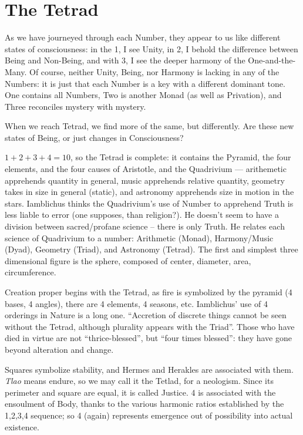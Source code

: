 \section{The Tetrad}

As we have journeyed through each Number, they appear to us like different states of consciousness: in the 1, I see Unity, in 2, I behold the difference between Being and Non-Being, and with 3, I see the deeper harmony of the One-and-the-Many. Of course, neither Unity, Being, nor Harmony is lacking in any of the Numbers: it is just that each Number is a key with a different dominant tone. One contains all Numbers, Two is another Monad (as well as Privation), and Three reconciles mystery with mystery.

When we reach Tetrad, we find more of the same, but differently. Are these new states of Being, or just changes in Consciousness?

$1+2+3+4=10$, so the Tetrad is complete: it contains the Pyramid, the four elements, and the four causes of Aristotle, and the Quadrivium --- arithemetic apprehends quantity in general, music apprehends relative quantity, geometry takes in size in general (static), and astronomy apprehends size in motion in the stars. Iamblichus thinks the Quadrivium's use of Number to apprehend Truth is less liable to error (one supposes, than religion?). He doesn't seem to have a division between sacred/profane science -- there is only Truth. He relates each science of Quadrivium to a number: Arithmetic (Monad), Harmony/Music (Dyad), Geometry (Triad), and Astronomy (Tetrad). The first and simplest three dimensional figure is the sphere, composed of center, diameter, area, circumference.

Creation proper begins with the Tetrad, as fire is symbolized by the pyramid (4 bases, 4 angles), there are 4 elements, 4 seasons, etc. Iamblichus' use of 4 orderings in Nature is a long one. ``Accretion of discrete things cannot be seen without the Tetrad, although plurality appears with the Triad''. Those who have died in virtue are not ``thrice-blessed'', but ``four times blessed'': they have gone beyond alteration and change.

Squares symbolize stability, and Hermes and Herakles are associated with them. \emph{Tlao} means endure, so we may call it the Tetlad, for a neologism. Since its perimeter and square are equal, it is called Justice. 4 is associated with the ensoulment of Body, thanks to the various harmonic ratios established by the 1,2,3,4 sequence; so 4 (again) represents emergence out of possibility into actual existence.


